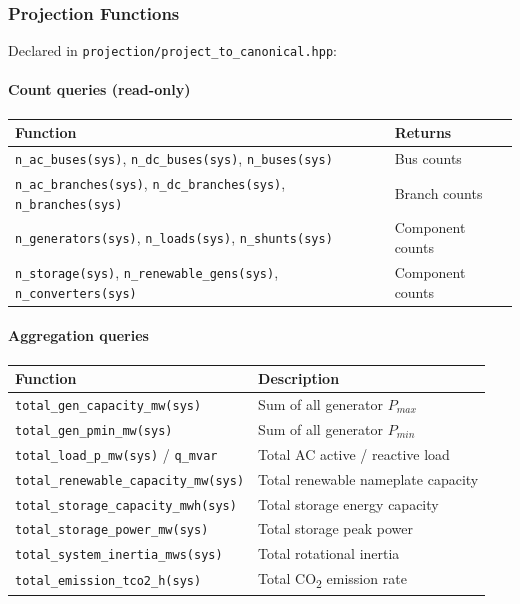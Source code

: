 \subsubsection{Projection Functions}

Declared in \texttt{projection/project\_to\_canonical.hpp}:

\paragraph{Count queries (read-only)}
\begin{center}
\begin{tabular}{ll}
\hline\hline
\textbf{Function} & \textbf{Returns} \\
\hline
\texttt{n\_ac\_buses(sys)}, \texttt{n\_dc\_buses(sys)}, \texttt{n\_buses(sys)} & Bus counts \\
\texttt{n\_ac\_branches(sys)}, \texttt{n\_dc\_branches(sys)}, \texttt{n\_branches(sys)} & Branch counts \\
\texttt{n\_generators(sys)}, \texttt{n\_loads(sys)}, \texttt{n\_shunts(sys)} & Component counts \\
\texttt{n\_storage(sys)}, \texttt{n\_renewable\_gens(sys)}, \texttt{n\_converters(sys)} & Component counts \\
\hline\hline
\end{tabular}
\end{center}

\paragraph{Aggregation queries}
\begin{center}
\begin{tabular}{ll}
\hline\hline
\textbf{Function} & \textbf{Description} \\
\hline
\texttt{total\_gen\_capacity\_mw(sys)} & Sum of all generator $P_{max}$ \\
\texttt{total\_gen\_pmin\_mw(sys)} & Sum of all generator $P_{min}$ \\
\texttt{total\_load\_p\_mw(sys)} / \texttt{q\_mvar} & Total AC active / reactive load \\
\texttt{total\_renewable\_capacity\_mw(sys)} & Total renewable nameplate capacity \\
\texttt{total\_storage\_capacity\_mwh(sys)} & Total storage energy capacity \\
\texttt{total\_storage\_power\_mw(sys)} & Total storage peak power \\
\texttt{total\_system\_inertia\_mws(sys)} & Total rotational inertia \\
\texttt{total\_emission\_tco2\_h(sys)} & Total CO\textsubscript{2} emission rate \\
\hline\hline
\end{tabular}
\end{center}

